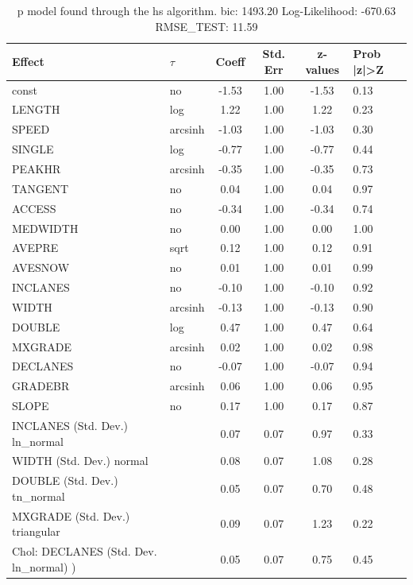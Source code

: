 \begin{table}
	\caption{p model found through the hs algorithm. bic: 1493.20 Log-Likelihood: -670.63 RMSE_TEST: 11.59}
	\begin{center}
		\begin{tabular}{|l|l|c|c|c|l|}
			\hline
			Effect & $\tau$ & Coeff & Std. Err & z-values & Prob |z|>Z \\
			\hline
			const & no & -1.53 & 1.00 & -1.53 & 0.13 \\
			\hline
			LENGTH & log & 1.22 & 1.00 & 1.22 & 0.23 \\
			\hline
			SPEED & arcsinh & -1.03 & 1.00 & -1.03 & 0.30 \\
			\hline
			SINGLE & log & -0.77 & 1.00 & -0.77 & 0.44 \\
			\hline
			PEAKHR & arcsinh & -0.35 & 1.00 & -0.35 & 0.73 \\
			\hline
			TANGENT & no & 0.04 & 1.00 & 0.04 & 0.97 \\
			\hline
			ACCESS & no & -0.34 & 1.00 & -0.34 & 0.74 \\
			\hline
			MEDWIDTH & no & 0.00 & 1.00 & 0.00 & 1.00 \\
			\hline
			AVEPRE & sqrt & 0.12 & 1.00 & 0.12 & 0.91 \\
			\hline
			AVESNOW & no & 0.01 & 1.00 & 0.01 & 0.99 \\
			\hline
			INCLANES & no & -0.10 & 1.00 & -0.10 & 0.92 \\
			\hline
			WIDTH & arcsinh & -0.13 & 1.00 & -0.13 & 0.90 \\
			\hline
			DOUBLE & log & 0.47 & 1.00 & 0.47 & 0.64 \\
			\hline
			MXGRADE & arcsinh & 0.02 & 1.00 & 0.02 & 0.98 \\
			\hline
			DECLANES & no & -0.07 & 1.00 & -0.07 & 0.94 \\
			\hline
			GRADEBR & arcsinh & 0.06 & 1.00 & 0.06 & 0.95 \\
			\hline
			SLOPE & no & 0.17 & 1.00 & 0.17 & 0.87 \\
			\hline
			INCLANES (Std. Dev.) ln_normal &  & 0.07 & 0.07 & 0.97 & 0.33 \\
			\hline
			WIDTH (Std. Dev.) normal &  & 0.08 & 0.07 & 1.08 & 0.28 \\
			\hline
			DOUBLE (Std. Dev.) tn_normal &  & 0.05 & 0.07 & 0.70 & 0.48 \\
			\hline
			MXGRADE (Std. Dev.) triangular &  & 0.09 & 0.07 & 1.23 & 0.22 \\
			\hline
			 Chol: DECLANES (Std. Dev. ln_normal) ) &  & 0.05 & 0.07 & 0.75 & 0.45 \\

\end{tabular}
\end{center}
\end{table}
